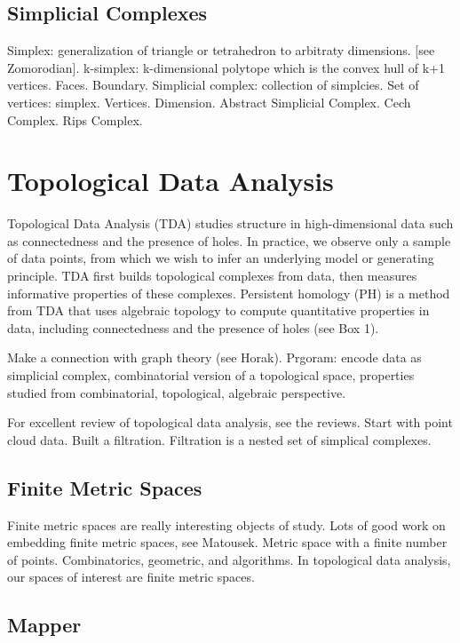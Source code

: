 \subsection{Simplicial Complexes}

Simplex: generalization of triangle or tetrahedron to arbitraty dimensions. [see Zomorodian].
k-simplex: k-dimensional polytope which is the convex hull of k+1 vertices.
Faces. Boundary.
Simplicial complex: collection of simplcies.
Set of vertices: simplex.
Vertices. Dimension.
Abstract Simplicial Complex.
Cech Complex.
Rips Complex.

\section{Topological Data Analysis}

Topological Data Analysis (TDA) studies structure in high-dimensional data such as connectedness and the presence of holes.
In practice, we observe only a sample of data points, from which we wish to infer an underlying model or generating principle.
TDA first builds topological complexes from data, then measures informative properties of these complexes. 
Persistent homology (PH) is a method from TDA that uses algebraic topology to compute quantitative properties in data, including connectedness and the presence of holes (see Box 1).

Make a connection with graph theory (see Horak). Prgoram: encode data as simplicial complex, combinatorial version of a topological space, properties studied from combinatorial, topological, algebraic perspective.

For excellent review of topological data analysis, see the reviews.
Start with point cloud data.
Built a filtration.
Filtration is a nested set of simplical complexes.

\subsection{Finite Metric Spaces}

Finite metric spaces are really interesting objects of study.
Lots of good work on embedding finite metric spaces, see Matousek.
Metric space with a finite number of points.
Combinatorics, geometric, and algorithms.
In topological data analysis, our spaces of interest are finite metric spaces.

\subsection{Mapper}

